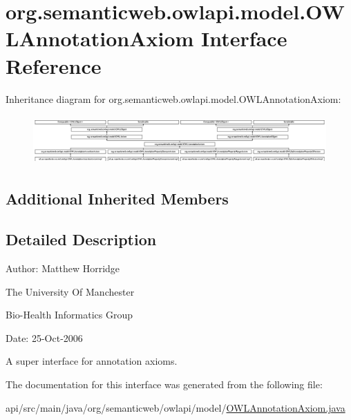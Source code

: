 \hypertarget{interfaceorg_1_1semanticweb_1_1owlapi_1_1model_1_1_o_w_l_annotation_axiom}{\section{org.\-semanticweb.\-owlapi.\-model.\-O\-W\-L\-Annotation\-Axiom Interface Reference}
\label{interfaceorg_1_1semanticweb_1_1owlapi_1_1model_1_1_o_w_l_annotation_axiom}
}
Inheritance diagram for org.\-semanticweb.\-owlapi.\-model.\-O\-W\-L\-Annotation\-Axiom\-:\begin{figure}[H]
\begin{center}
\leavevmode
\includegraphics[height=1.913440cm]{interfaceorg_1_1semanticweb_1_1owlapi_1_1model_1_1_o_w_l_annotation_axiom}
\end{center}
\end{figure}
\subsection*{Additional Inherited Members}


\subsection{Detailed Description}
Author\-: Matthew Horridge\par
 The University Of Manchester\par
 Bio-\/\-Health Informatics Group\par
 Date\-: 25-\/\-Oct-\/2006\par
\par
 

A super interface for annotation axioms. 

The documentation for this interface was generated from the following file\-:\begin{DoxyCompactItemize}
\item 
api/src/main/java/org/semanticweb/owlapi/model/\hyperlink{_o_w_l_annotation_axiom_8java}{O\-W\-L\-Annotation\-Axiom.\-java}\end{DoxyCompactItemize}
